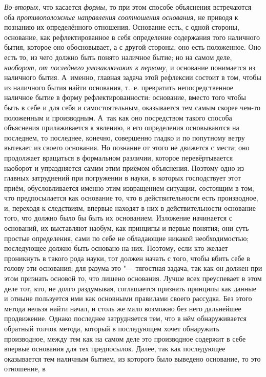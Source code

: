 {\em Во-вторых,} что касается {\em формы,} то при этом способе объяснения
встречаются оба {\em противоположные направления соотношения основания,} не
приводя к познанию их определённого отношения. Основание есть, с одной стороны,
основание, как рефлектированное в себя определение содержания того наличного
бытия, которое оно обосновывает, а с другой стороны, оно есть положенное. Оно
есть то, из чего должно быть понято наличное бытие; но на самом деле,
{\em наоборот, от последнего умозаключают к первому,} и основание понимается из
наличного бытия. А~именно, главная задача этой рефлексии состоит в том, чтобы
из наличного бытия найти основания, т.~е. превратить непосредственное наличное
бытие в форму рефлектированности: основание, вместо того чтобы быть в себе и
для себя и самостоятельным, оказывается тем самым скорее чем-то положенным и
производным. А~так как оно посредством такого способа объяснения прилаживается
к явлению, в его определения основываются на последнем, то последнее, конечно,
совершенно гладко и по попутному ветру вытекает из своего основания. Но
познание от этого не движется с места; оно продолжает вращаться в формальном
различии, которое перевёртывается наоборот и упраздняется самим этим приёмом
объяснения. Поэтому одно из главных затруднений при погружении в науки, в
которых господствует этот приём, обусловливается именно этим извращением
ситуации, состоящим в том, что предпосылается как основание то, что в
действительности есть производное, и, переходя к следствиям, впервые находят в
них в действительности основание того, что должно было бы быть их основанием.
Изложение начинается с оснований, их выставляют наобум, как принципы и первые
понятия; они суть простые определения, сами по себе не обладающие никакой
необходимостью; последующее должно быть основано на них. Поэтому, если кто
желает проникнуть в такого рода науки, тот должен начать с того, чтобы вбить
себе в голову эти основания; для разума это "--- тягостная задача, так как он
должен при этом признать основой то, что лишено основания. Лучше всех
преуспевает в этом деле тот, кто, не долго раздумывая, соглашается признать
принципы как данные и отныне пользуется ими как основными правилами своего
рассудка. Без этого метода нельзя найти начал, и столь же мало возможно без
него дальнейшее продвижение. Однако последнее затрудняется тем, что в нём
обнаруживается обратный толчок метода, который в последующем хочет обнаружить
производное, между тем как на самом деле это производное содержит в себе
впервые основания для тех предпосылок. Далее, так как последующее оказывается
тем наличным бытием, из которого было выведено основание, то это отношение, в
